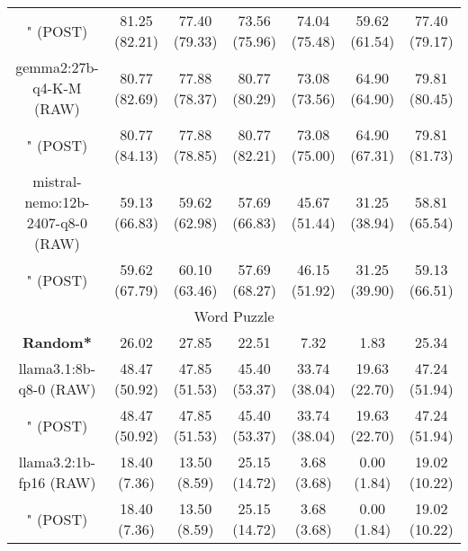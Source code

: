\begin{table}[]
{\begin{tabular}{ccccccc}
      \multicolumn{1}{c|}{" (POST)} & 81.25 (82.21) & 77.40 (79.33) & \multicolumn{1}{c|}{73.56 (75.96)} & 74.04 (75.48) & \multicolumn{1}{c|}{59.62 (61.54)} & 77.40 (79.17) \\
      \cline{1-7}

      \multicolumn{1}{c|}{gemma2:27b-q4-K-M (RAW)} & 80.77 (82.69) & 77.88 (78.37) & \multicolumn{1}{c|}{80.77 (80.29)} & 73.08 (73.56) & \multicolumn{1}{c|}{64.90 (64.90)} & 79.81 (80.45) \\

      \multicolumn{1}{c|}{" (POST)} & 80.77 (84.13) & 77.88 (78.85) & \multicolumn{1}{c|}{80.77 (82.21)} & 73.08 (75.00) & \multicolumn{1}{c|}{64.90 (67.31)} & 79.81 (81.73) \\
      \cline{1-7}

      \multicolumn{1}{c|}{mistral-nemo:12b-2407-q8-0 (RAW)} & 59.13 (66.83) & 59.62 (62.98) & \multicolumn{1}{c|}{57.69 (66.83)} & 45.67 (51.44) & \multicolumn{1}{c|}{31.25 (38.94)} & 58.81 (65.54) \\

      \multicolumn{1}{c|}{" (POST)} & 59.62 (67.79) & 60.10 (63.46) & \multicolumn{1}{c|}{57.69 (68.27)} & 46.15 (51.92) & \multicolumn{1}{c|}{31.25 (39.90)} & 59.13 (66.51) \\
      \cline{1-7}

      \hline
      \multicolumn{7}{c}{Word Puzzle} \\ \hline
      \multicolumn{1}{c|}{\textbf{Random*}} & 26.02 & 27.85 & \multicolumn{1}{c|}{22.51} & 7.32 & \multicolumn{1}{c|}{1.83} & 25.34 \\ \hline

      \multicolumn{1}{c|}{llama3.1:8b-q8-0 (RAW)} & 48.47 (50.92) & 47.85 (51.53) & \multicolumn{1}{c|}{45.40 (53.37)} & 33.74 (38.04) & \multicolumn{1}{c|}{19.63 (22.70)} & 47.24 (51.94) \\

      \multicolumn{1}{c|}{" (POST)} & 48.47 (50.92) & 47.85 (51.53) & \multicolumn{1}{c|}{45.40 (53.37)} & 33.74 (38.04) & \multicolumn{1}{c|}{19.63 (22.70)} & 47.24 (51.94) \\
      \cline{1-7}

      \multicolumn{1}{c|}{llama3.2:1b-fp16 (RAW)} & 18.40 (7.36) & 13.50 (8.59) & \multicolumn{1}{c|}{25.15 (14.72)} & 3.68 (3.68) & \multicolumn{1}{c|}{0.00 (1.84)} & 19.02 (10.22) \\

      \multicolumn{1}{c|}{" (POST)} & 18.40 (7.36) & 13.50 (8.59) & \multicolumn{1}{c|}{25.15 (14.72)} & 3.68 (3.68) & \multicolumn{1}{c|}{0.00 (1.84)} & 19.02 (10.22) \\
      \cline{1-7}


\end{tabular}}
\end{table}

